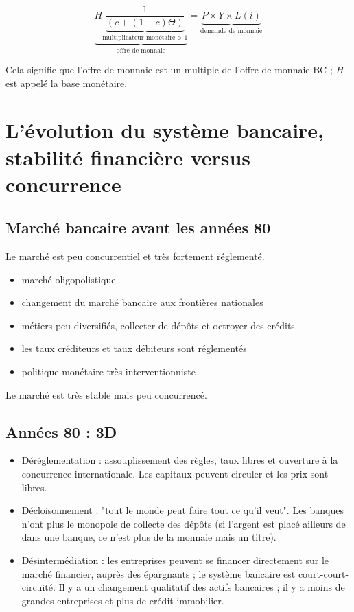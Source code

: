 	$$\underbrace{H \underbrace{\frac{1}{(c + ( 1  - c) \Theta)}}_{\text{multiplicateur monétaire} > 1}}_{\text{offre de monnaie}} = \underbrace{P \times  Y \times  L(i)}_{\text{demande de monnaie}}$$
	
	Cela signifie que l'offre de monnaie est un multiple de l'offre de monnaie BC ; $H$ est appelé la base monétaire.
	
\section{L'évolution du système bancaire, stabilité financière versus concurrence}
	
	\subsection{Marché bancaire avant les années 80}

	Le marché est peu concurrentiel et très fortement réglementé.
	
	\begin{itemize}
		\item marché oligopolistique
		\item changement du marché bancaire aux frontières nationales
		\item métiers peu diversifiés, collecter de dépôts et octroyer des crédits
		\item les taux créditeurs et taux débiteurs sont réglementés
		\item politique monétaire très interventionniste
	\end{itemize}
	
	Le marché est très stable mais peu concurrencé.
	
	\subsection{Années 80 : 3D}
	
	\begin{itemize}
		\item Déréglementation : assouplissement des règles, taux libres et ouverture à la concurrence internationale. Les capitaux peuvent circuler et les prix sont libres.
		\item Décloisonnement : "tout le monde peut faire tout ce qu'il veut". Les banques n'ont plus le monopole de collecte des dépôts (si l'argent est placé ailleurs de dans une banque, ce n'est plus de la monnaie mais un titre).
		\item Désintermédiation :  les entreprises peuvent se financer directement sur le marché financier, auprès des épargnants ; le système bancaire est court-court-circuité. Il y a un changement qualitatif des actifs bancaires ; il y a moins de grandes entreprises et plus de crédit immobilier.
	\end{itemize}
	

